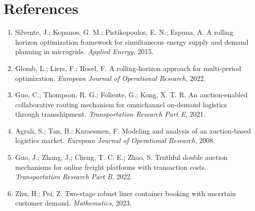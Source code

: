 \documentclass[11pt,a4paper]{article}
\begin{document}
\section{References}
\begin{enumerate}[label={(\arabic*)},leftmargin=*]
    \item Silvente, J.; Kopanos, G. M.; Pistikopoulos, E. N.; Espuna, A. A rolling horizon optimization framework for simultaneous energy supply and demand planning in microgrids. \textit{Applied Energy}, 2015.
    \item Glomb, L.; Liers, F.; Rosel, F. A rolling-horizon approach for multi-period optimization. \textit{European Journal of Operational Research}, 2022.
    \item Guo, C.; Thompson, R. G.; Foliente, G.; Kong, X. T. R. An auction-enabled collaborative routing mechanism for omnichannel on-demand logistics through transshipment. \textit{Transportation Research Part E}, 2021.
    \item Agrali, S.; Tan, B.; Karaesmen, F. Modeling and analysis of an auction-based logistics market. \textit{European Journal of Operational Research}, 2008.
    \item Guo, J.; Zhang, J.; Cheng, T. C. E.; Zhao, S. Truthful double auction mechanisms for online freight platforms with transaction costs. \textit{Transportation Research Part B}, 2022.
    \item Zhu, H.; Pei, Z. Two-stage robust liner container booking with uncertain customer demand. \textit{Mathematics}, 2023.
\end{enumerate}
\end{document}
